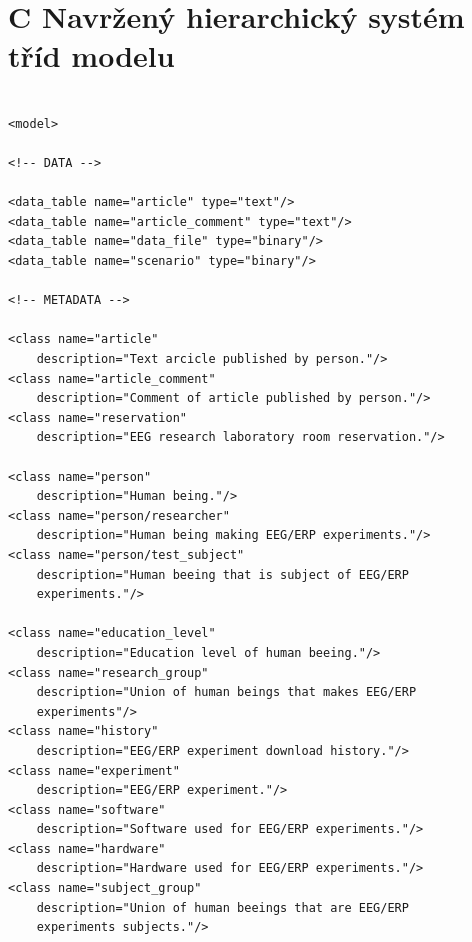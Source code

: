 \documentclass{projekt}
\begin{document}
\section*{{\LARGE C} Navržený hierarchický systém tříd modelu}
\begin{verbatim}

<model>

<!-- DATA -->

<data_table name="article" type="text"/>
<data_table name="article_comment" type="text"/>
<data_table name="data_file" type="binary"/>
<data_table name="scenario" type="binary"/>

<!-- METADATA -->

<class name="article" 
    description="Text arcicle published by person."/>
<class name="article_comment" 
    description="Comment of article published by person."/>
<class name="reservation" 
    description="EEG research laboratory room reservation."/>

<class name="person" 
    description="Human being."/>
<class name="person/researcher" 
    description="Human being making EEG/ERP experiments."/>
<class name="person/test_subject" 
    description="Human beeing that is subject of EEG/ERP 
    experiments."/>

<class name="education_level" 
    description="Education level of human beeing."/>
<class name="research_group" 
    description="Union of human beings that makes EEG/ERP 
    experiments"/>
<class name="history" 
    description="EEG/ERP experiment download history."/>
<class name="experiment" 
    description="EEG/ERP experiment."/>
<class name="software" 
    description="Software used for EEG/ERP experiments."/>
<class name="hardware" 
    description="Hardware used for EEG/ERP experiments."/>
<class name="subject_group" 
    description="Union of human beeings that are EEG/ERP 
    experiments subjects."/>
\end{verbatim}

\thispagestyle{plain}
\end{document}
